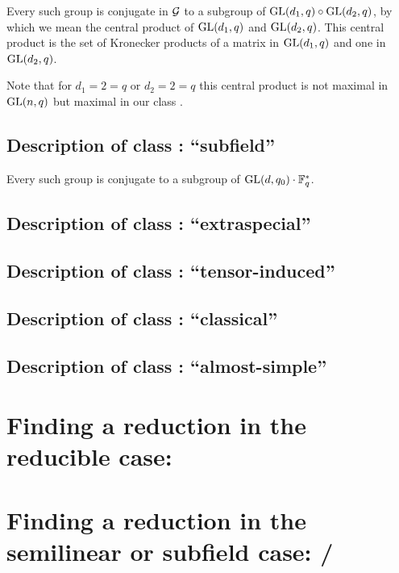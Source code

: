 \stru
Every such group is conjugate in $\mathcal{G}$ to a subgroup of $\GL(d_1,q)
\circ \GL(d_2,q)$, by which we mean the central product of $\GL(d_1,q)$ and
$\GL(d_2,q)$. This central product is the set of Kronecker products of
a matrix in $\GL(d_1,q)$ and one in $\GL(d_2,q)$.

Note that for $d_1=2=q$ or $d_2 = 2 = q$ this central product is not 
maximal in $\GL(n,q)$ but maximal in our class .

\subsection{Description of class : ``subfield''}
\label{descC5}


\stru
Every such group is conjugate to a subgroup of $\GL(d,q_0) \cdot \F_q^*$.

\subsection{Description of class : ``extraspecial''}
\label{descC6}

\subsection{Description of class : ``tensor-induced''}
\label{descC7}

\subsection{Description of class : ``classical''}
\label{descC8}

\subsection{Description of class : ``almost-simple''}
\label{descC9}

\section{Finding a reduction in the reducible case: }
\label{solveC1}

\section{Finding a reduction in the semilinear or subfield case: /}
\label{solveC3C5}

